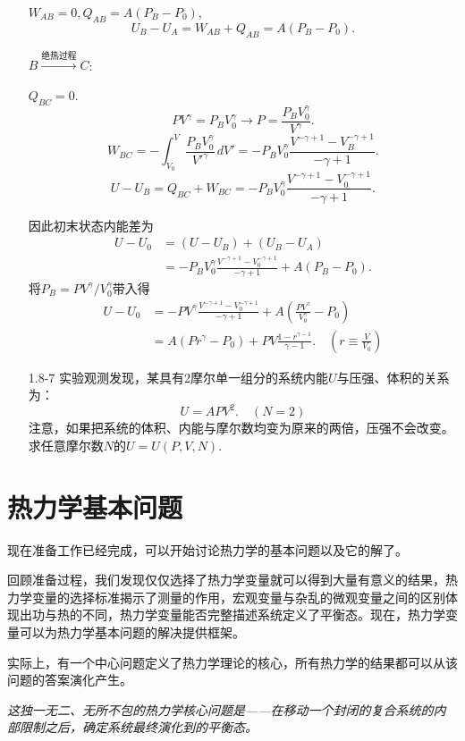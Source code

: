 \begin{enumerate}
{			$W_{AB} = 0, Q_{AB} = A(P_B - P_0)$,
			\[ U_B - U_A = W_{AB} + Q_{AB} = A(P_B - P_0). \]

			$B \stackrel{\text{绝热过程}}{\longrightarrow} C$: 
				
			$Q_{BC} = 0$.
			\[ P V^\gamma = P_B V_0^\gamma \to P = \frac{P_B V_0^\gamma}{V^\gamma}. \]
			\[ W_{BC} = -\int_{V_0}^{V} \frac{P_B V_0^\gamma}{V'^\gamma} \,dV' = -P_B V_0^\gamma \frac{V^{-\gamma + 1} - V_B^{-\gamma + 1}}{-\gamma + 1}. \]
			\[ U - U_B = Q_{BC} + W_{BC} = -P_B V_0^\gamma \frac{V^{-\gamma + 1} - V_0^{-\gamma + 1}}{-\gamma + 1}. \]

			因此初末状态内能差为
			\begin{align*}
				U - U_0 &= (U - U_B) + (U_B - U_A) \\
				&= -P_B V_0^\gamma \frac{ V^{-\gamma + 1} - V_0^{-\gamma + 1} }{-\gamma + 1} + A(P_B - P_0).
			\end{align*}
			将$P_B = PV^\gamma / V_0^\gamma$带入得
			\begin{align*}
				U - U_0 &= -P V^\gamma \frac{V^{-\gamma + 1} - V_0^{-\gamma + 1} }{-\gamma + 1} + A( \frac{PV^\gamma}{V_0^\gamma} - P_0) \\
				&= A(Pr^\gamma - P_0) + PV \frac{1 - r^{\gamma - 1}}{\gamma - 1}. \quad (r \equiv \frac{V}{V_0})
			\end{align*}
		}

		\item[1.8-7]
			实验观测发现，某具有2摩尔单一组分的系统内能$U$与压强、体积的关系为：
			\[ U = APV^2. \quad (N = 2) \]
			注意，如果把系统的体积、内能与摩尔数均变为原来的两倍，压强不会改变。求任意摩尔数$N$的$U = U(P, V, N)$.
\end{enumerate}


\section{热力学基本问题}
\label{sec1.9}
现在准备工作已经完成，可以开始讨论热力学的基本问题以及它的解了。

回顾准备过程，我们发现仅仅选择了热力学变量就可以得到大量有意义的结果，热力学变量的选择标准揭示了测量的作用，宏观变量与杂乱的微观变量之间的区别体现出功与热的不同，热力学变量能否完整描述系统定义了平衡态。现在，热力学变量可以为热力学基本问题的解决提供框架。

实际上，有一个中心问题定义了热力学理论的核心，所有热力学的结果都可以从该问题的答案演化产生。

{\it 这独一无二、无所不包的热力学核心问题是——在移动一个封闭的复合系统的内部限制之后，确定系统最终演化到的平衡态。}

